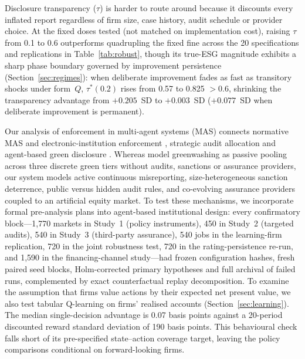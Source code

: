 \documentclass[11pt]{article}
\begin{document}
\begin{enumerate}[leftmargin=*]
\end{enumerate}
Disclosure transparency ($\tau$) is harder to route around because it discounts every inflated report regardless of firm size, case history, audit schedule or provider choice. At the fixed doses tested (not matched on implementation cost), raising $\tau$ from 0.1 to 0.6 outperforms quadrupling the fixed fine across the 20 specifications and replications in Table~\ref{tab:robust}, though its true-ESG magnitude exhibits a sharp phase boundary governed by improvement persistence (Section~\ref{sec:regimes}): when deliberate improvement fades as fast as transitory shocks under form~$Q$, $\tau^*(0.2)$ rises from 0.57 to 0.825 $> 0.6$, shrinking the transparency advantage from $+0.205$~SD to $+0.003$~SD ($+0.077$~SD when deliberate improvement is permanent).

Our analysis of enforcement in multi-agent systems (MAS) connects normative MAS and electronic-institution enforcement \citep{boella2006introduction,arcos2005engineering,balke2013iabm,dellanna2020runtime}, strategic audit allocation \citep{tambe2011security,blocki2015audit} and agent-based green disclosure \citep{zhao2025agent,zhao2026green}. Whereas \citet{zhao2025agent,zhao2026green} model greenwashing as passive pooling across three discrete green tiers without audits, sanctions or assurance providers, our system models active continuous misreporting, size-heterogeneous sanction deterrence, public versus hidden audit rules, and co-evolving assurance providers coupled to an artificial equity market. To test these mechanisms, we incorporate formal pre-analysis plans \citep{olken2015promises} into agent-based institutional design: every confirmatory block---1,770 markets in Study~1 (policy instruments), 450 in Study~2 (targeted audits), 540 in Study~3 (third-party assurance), 540 jobs in the learning-firm replication, 720 in the joint robustness test, 720 in the rating-persistence re-run, and 1,590 in the financing-channel study---had frozen configuration hashes, fresh paired seed blocks, Holm-corrected primary hypotheses and full archival of failed runs, complemented by exact counterfactual replay decomposition. To examine the assumption that firms value actions by their expected net present value, we also test tabular Q-learning on firms' realised accounts (Section~\ref{sec:learning}). The median single-decision advantage is 0.07 basis points against a 20-period discounted reward standard deviation of 190 basis points. This behavioural check falls short of its pre-specified state--action coverage target, leaving the policy comparisons conditional on forward-looking firms.
\end{document}
